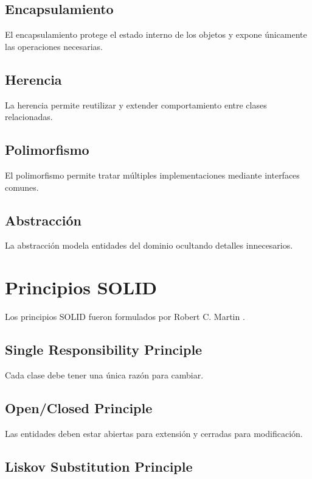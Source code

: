 \documentclass[stu,12pt,floatsintext]{apa7}
\begin{document}
\subsection{Encapsulamiento}

El encapsulamiento protege el estado interno de los objetos y expone únicamente las operaciones necesarias.

\subsection{Herencia}

La herencia permite reutilizar y extender comportamiento entre clases relacionadas.

\subsection{Polimorfismo}

El polimorfismo permite tratar múltiples implementaciones mediante interfaces comunes.

\subsection{Abstracción}

La abstracción modela entidades del dominio ocultando detalles innecesarios.


\section{Principios SOLID}

Los principios SOLID fueron formulados por Robert C. Martin \parencite{martin2003}.

\subsection{Single Responsibility Principle}

Cada clase debe tener una única razón para cambiar.

\subsection{Open/Closed Principle}

Las entidades deben estar abiertas para extensión y cerradas para modificación.

\subsection{Liskov Substitution Principle}
\end{document}
